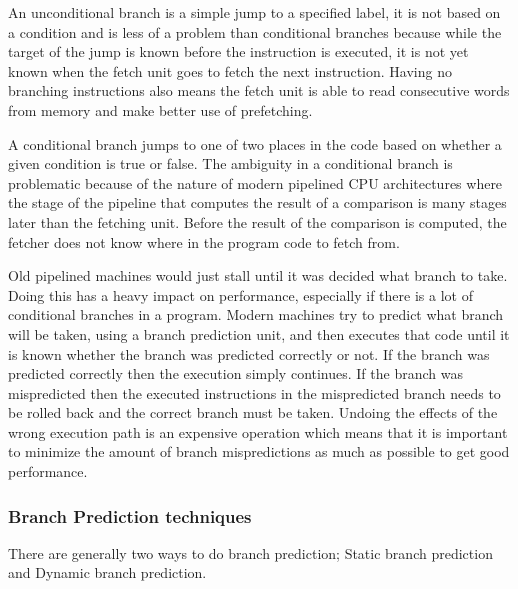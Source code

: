 An unconditional branch is a simple jump to a specified label, it is not based on a condition and is less of a problem than conditional branches because while the target of the jump is known before the instruction is executed, it is not yet known when the fetch unit goes to fetch the next instruction.
Having no branching instructions also means the fetch unit is able to read consecutive words from memory and make better use of prefetching.

A conditional branch jumps to one of two places in the code based on whether a given condition is true or false.
The ambiguity in a conditional branch is problematic because of the nature of modern pipelined CPU architectures where the stage of the pipeline that computes the result of a comparison is many stages later than the fetching unit.
Before the result of the comparison is computed, the fetcher does not know where in the program code to fetch from.

Old pipelined machines would just stall until it was decided what branch to take. 
Doing this has a heavy impact on performance, especially if there is a lot of conditional branches in a program.
Modern machines try to predict what branch will be taken, using a branch prediction unit, and then executes that code until it is known whether the branch was predicted correctly or not. 
If the branch was predicted correctly then the execution simply continues.
If the branch was mispredicted then the executed instructions in the mispredicted branch needs to be rolled back and the correct branch must be taken. 
Undoing the effects of the wrong execution path is an expensive operation which means that it is important to minimize the amount of branch mispredictions as much as possible to get good performance.

\subsubsection{Branch Prediction techniques}
There are generally two ways to do branch prediction; Static branch prediction and Dynamic branch prediction.

